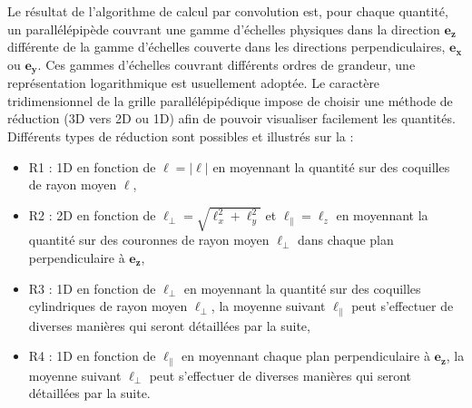 \begin{figure}[!ht]
\label{fig:rep_CGL1}
\end{figure}
Le résultat de l'algorithme de calcul par convolution est, pour chaque quantité, un parallélépipède couvrant une gamme d'échelles physiques dans la direction $\boldsymbol{e_z}$ différente de la gamme d'échelles couverte dans les directions perpendiculaires, $\boldsymbol{e_x}$ ou $\boldsymbol{e_y}$.  
Ces gammes d'échelles couvrant différents ordres de grandeur, une représentation logarithmique est usuellement adoptée. Le caractère tridimensionnel de la grille parallélépipédique impose de choisir une méthode de réduction (\ac{3D} vers \acs{2D} ou \acs{1D}) afin de pouvoir visualiser facilement les quantités. Différents types de réduction sont possibles et illustrés sur la  : 

\begin{itemize}
    \item R1 : \acs{1D} en fonction de $\ell = |\boldsymbol{\ell}|$ en moyennant la quantité sur des coquilles de rayon moyen $\ell$,
    \item R2 : \acs{2D} en fonction de $\ell_{\perp} = \sqrt{\ell_x^2 + \ell_y^2}$ et $\ell_{\parallel} = \ell_z$ en moyennant la quantité sur des couronnes de rayon moyen $\ell_{\perp}$ dans chaque plan perpendiculaire à $\boldsymbol{e_z}$,
    \item R3 : \acs{1D} en fonction de $\ell_{\perp}$ en moyennant la quantité sur des coquilles cylindriques de rayon moyen $\ell_{\perp}$, la moyenne suivant $\ell_{\parallel}$ peut s'effectuer de diverses manières qui seront détaillées par la suite,
    \item R4 : \acs{1D} en fonction de $\ell_{\parallel}$ en moyennant chaque plan perpendiculaire à $\boldsymbol{e_z}$, la moyenne suivant $\ell_{\perp}$ peut s'effectuer de diverses manières qui seront détaillées par la suite. 
\end{itemize}

